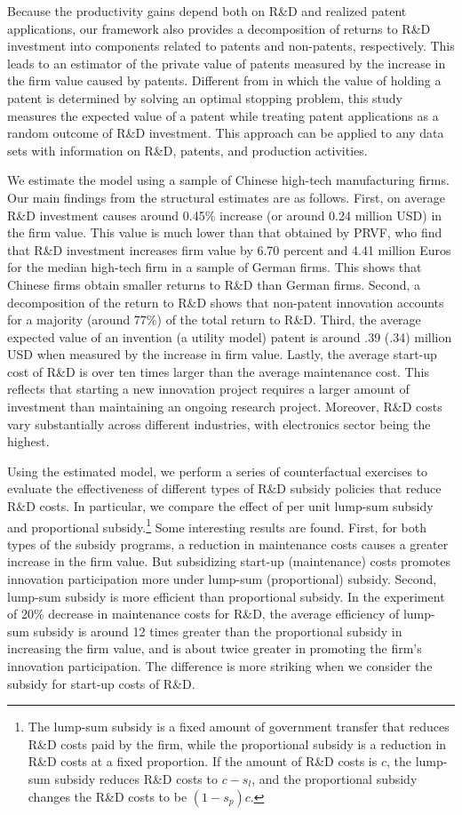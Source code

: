 \documentclass[11pt]{article}
\begin{document}
Because the productivity gains depend both on R\&D and realized patent applications, our framework also provides a decomposition of returns to R\&D investment into components related to patents and non-patents, respectively. This leads to an estimator of the private value of patents measured by the increase in the firm value caused by patents. Different from \citet{pakes1986} in which the value of holding a patent is determined by solving an optimal stopping problem, this study measures the expected value of a patent while treating patent applications as a random outcome of R\&D investment. This approach can be applied to any data sets with information on R\&D, patents, and production activities.

We estimate the model using a sample of Chinese high-tech manufacturing firms. Our main findings from the structural estimates are as follows. First, on average R\&D investment causes around 0.45\% increase (or around 0.24 million USD) in the firm value. This value is much lower than that obtained by PRVF, who find that R\&D investment increases firm value by 6.70 percent and 4.41 million Euros for the median high-tech firm in a sample of German firms. This shows that Chinese firms obtain smaller returns to R\&D than German firms. Second, a decomposition of the return to R\&D shows that non-patent innovation accounts for a majority (around 77\%) of the total return to R\&D. Third, the average expected value of an invention (a utility model) patent is around .39 (.34) million USD when measured by the increase in firm value. Lastly, the average start-up cost of R\&D is over ten times larger than the average maintenance cost. This reflects that starting a new innovation project requires a larger amount of investment than maintaining an ongoing research project. Moreover, R\&D costs vary substantially across different industries, with electronics sector being the highest.

Using the estimated model, we perform a series of counterfactual exercises to evaluate the effectiveness of different types of R\&D subsidy policies that reduce R\&D costs. In particular, we compare the effect of per unit lump-sum subsidy and proportional subsidy.\footnote{The lump-sum subsidy is a fixed amount of government transfer that reduces R\&D costs paid by the firm, while the proportional subsidy is a reduction in R\&D costs at a fixed proportion. If the amount of R\&D costs is $c$, the lump-sum subsidy reduces R\&D costs to $c-s_l$, and the proportional subsidy changes the R\&D costs to be $(1-s_p)c$.} Some interesting results are found. First, for both types of the subsidy programs, a reduction in maintenance costs causes a greater increase in the firm value. But subsidizing start-up (maintenance) costs promotes innovation participation more under lump-sum (proportional) subsidy. Second, lump-sum subsidy is more efficient than proportional subsidy. In the experiment of 20\% decrease in maintenance costs for R\&D, the average efficiency of lump-sum subsidy is around 12 times greater than the proportional subsidy in increasing the firm value, and is about twice greater in promoting the firm's innovation participation. The difference is more striking when we consider the subsidy for start-up costs of R\&D. 
\end{document}
